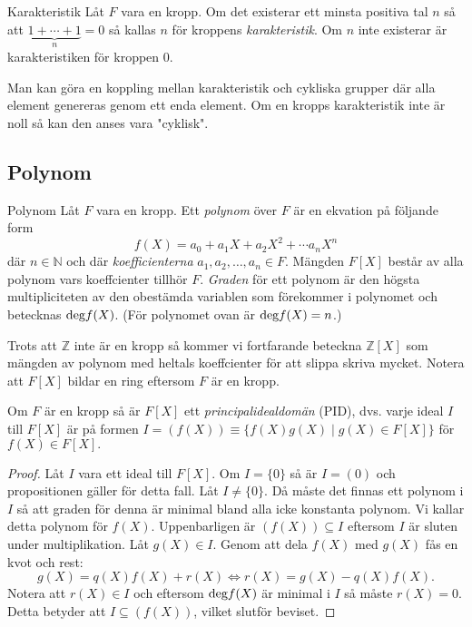\documentclass{article}
\newcommand{\grad}[0]{\textnormal{deg}}
\theoremstyle{definition}
\begin{document}
\begin{mydef}{Karakteristik}{}
  Låt $F$ vara en kropp. Om det existerar ett minsta positiva tal $n$ så att $\underbrace{1 + \cdots + 1}_{n} = 0$ så kallas $n$ för kroppens \textit{karakteristik}.
  Om $n$ inte existerar är karakteristiken för kroppen $0.$
\end{mydef}
Man kan göra en koppling mellan karakteristik och cykliska grupper där alla element genereras genom ett enda element. Om en kropps karakteristik inte är noll
så kan den anses vara "cyklisk". 

\subsection{Polynom}
\begin{mydef}{Polynom}{}
  Låt $F$ vara en kropp. Ett \textit{polynom} över $F$ är en ekvation på följande form
  \[f(X) = a_0 + a_1X + a_2X^2 + \cdots a_nX^n\]
  där $n \in \mathbb{N}$ och där \textit{koefficienterna} $a_1, a_2, \ldots, a_n \in F$. 
  Mängden $F[X]$ består av alla polynom vars koeffcienter tillhör $F$. \textit{Graden} för ett polynom är den högsta multipliciteten av den obestämda variablen som förekommer i  
  polynomet och betecknas $\grad f(X)$. (För polynomet ovan är $\grad f(X) = n$.)
\end{mydef}
Trots att $\mathbb{Z}$ inte är en kropp så kommer vi fortfarande beteckna $\mathbb{Z}[X]$ som mängden av polynom med heltals koeffcienter
för att slippa skriva mycket. Notera att $F[X]$ bildar en ring eftersom $F$ är en kropp.

\hypertarget{pid}{}
\begin{myprop}{}{}
  Om $F$ är en kropp så är $F[X]$ ett \textit{principalidealdomän} (PID), dvs. varje ideal $I$ till $F[X]$ är på formen 
  $I = (f(X)) \equiv \{f(X)g(X) \; | \; g(X) \in F[X]\}$ för $f(X) \in F[X].$
\end{myprop}
\begin{proof}
  Låt $I$ vara ett ideal till $F[X]$. Om $I = \{0\}$ så är $I = (0)$ och propositionen gäller för detta fall. Låt $I \neq \{0\}$.
  Då måste det finnas ett polynom i $I$ så att graden för denna är minimal bland alla icke konstanta polynom. Vi kallar detta polynom 
  för $f(X).$ Uppenbarligen är $(f(X)) \subseteq I$ eftersom $I$ är sluten under multiplikation. Låt $g(X) \in I$. 
  Genom att dela $f(X)$ med $g(X)$ fås en kvot och rest: 
  \[g(X) = q(X)f(X) + r(X) \iff r(X) = g(X) - q(X)f(X).\]
  Notera att $r(X) \in I$ och eftersom $\grad f(X)$ är minimal i $I$ så måste $r(X) = 0.$ Detta betyder att $I \subseteq (f(X))$, vilket 
  slutför beviset.
\end{proof}
\end{document}
